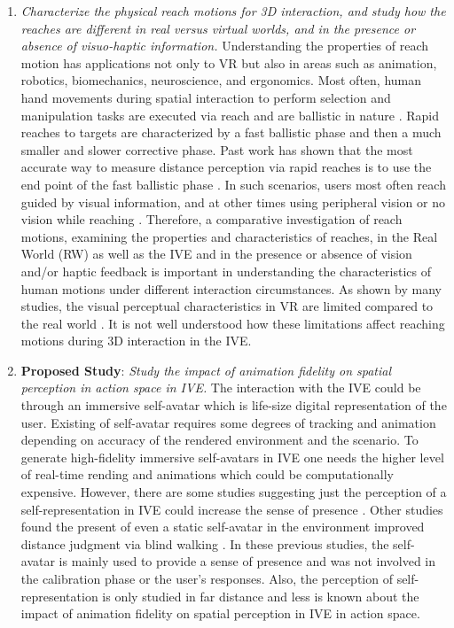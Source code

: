\begin{enumerate}
	\item \textit{Characterize the physical reach motions for 3D interaction, and study how the reaches are different in real versus virtual worlds, and in the presence or absence of visuo-haptic information.} Understanding the properties of reach motion has applications not only to VR but also in areas such as animation, robotics, biomechanics, neuroscience, and ergonomics. Most often, human hand movements during spatial interaction to perform selection and manipulation tasks are executed via reach and are ballistic in nature \cite{ts55}. Rapid reaches to targets are characterized by a fast ballistic phase and then a much smaller and slower corrective phase. Past work has shown that the most accurate way to measure distance perception via rapid reaches is to use the end point of the fast ballistic phase \cite{BP98}. In such scenarios, users most often reach guided by visual information, and at other times using peripheral vision or no vision while reaching \cite{ss98}. Therefore, a comparative investigation of reach motions, examining the properties and characteristics of reaches, in the Real World (RW) as well as the IVE and in the presence or absence of vision and/or haptic feedback is important in understanding the characteristics of human motions under different interaction circumstances. As shown by many studies, the visual perceptual characteristics in VR are limited compared to the real world \cite{lk03}. It is not well understood how these limitations affect reaching motions during 3D interaction in the IVE.
	
	\item \textbf{Proposed Study}: \textit{Study the impact of animation fidelity on spatial perception in action space in IVE.} The interaction with the IVE could be through an immersive self-avatar which is life-size digital representation of the user. Existing of self-avatar requires some degrees of tracking and animation depending on accuracy of the rendered environment and the scenario. To generate high-fidelity immersive self-avatars in IVE one needs the higher level of real-time rending and animations which could be computationally expensive. However, there are some studies suggesting just the perception of a self-representation in IVE could increase the sense of presence \cite{LNW+03}. Other studies found the present of even a static self-avatar in the environment improved distance judgment via blind walking \cite{RIK+08,MCW+10}. In these previous studies, the self-avatar is mainly used to provide a sense of presence and was not involved in the calibration phase or the user's responses. Also, the perception of self-representation is only studied in far distance and less is known about the impact of animation fidelity on spatial perception in IVE in action space.
\end{enumerate}
















